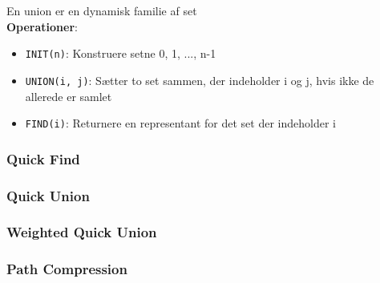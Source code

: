 En union er en dynamisk familie af set\\
\textbf{Operationer}:
\begin{itemize}
	\item \texttt{INIT(n)}: Konstruere setne {0}, {1}, ..., {n-1}
	\item \texttt{UNION(i, j)}: Sætter to set sammen, der indeholder i og j, hvis ikke de allerede er samlet
	\item \texttt{FIND(i)}: Returnere en representant for det set der indeholder i
\end{itemize}

\subsubsection{Quick Find}

\newpage

\subsubsection{Quick Union}

\newpage

\subsubsection{Weighted Quick Union}


\subsubsection{Path Compression}
